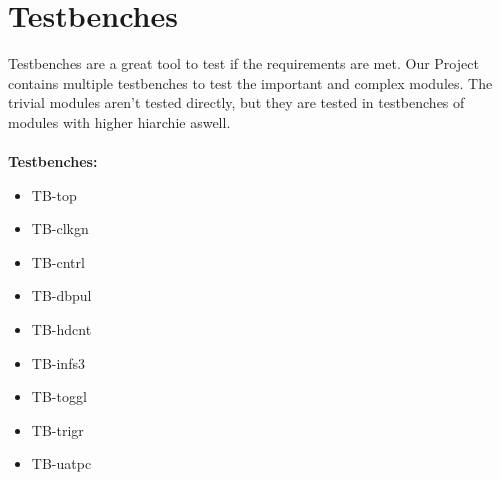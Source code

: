 \documentclass[12pt,a4 paper] {report}
\begin{document}
\newpage

\chapter{Testbenches}
Testbenches are a great tool to test if the requirements are met. Our Project contains multiple testbenches to test the
important and complex modules. The trivial modules aren't tested directly, but they are tested in testbenches of modules 
with higher hiarchie aswell. \\ \\
\textbf{Testbenches:}
\begin{itemize}
	\item TB-top
	\item TB-clkgn
	\item TB-cntrl
	\item TB-dbpul
	\item TB-hdcnt
	\item TB-infs3
	\item TB-toggl
	\item TB-trigr
	\item TB-uatpc
\end{itemize}

\newpage
\end{document}
